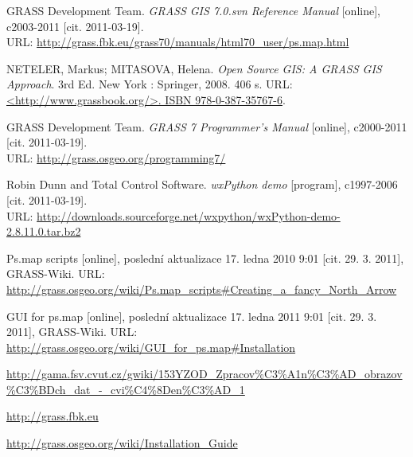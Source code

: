 \documentclass[a4paper,12pt,draft]{article}
\begin{document}
\begin{thebibliography}{9}
\label{literatura}
GRASS Development Team. \textit{GRASS GIS 7.0.svn Reference Manual} [online], c2003-2011 [cit. 2011-03-19].\\ URL: \url{http://grass.fbk.eu/grass70/manuals/html70_user/ps.map.html}

NETELER, Markus; MITASOVA, Helena. \textit{Open Source GIS: A GRASS GIS Approach}. 3rd Ed. New York : Springer, 2008. 406 s. URL: \url{<http://www.grassbook.org/>. ISBN 978-0-387-35767-6}.

GRASS Development Team. \textit{GRASS 7 Programmer's Manual} [online], c2000-2011 [cit. 2011-03-19].\\ URL: \url{http://grass.osgeo.org/programming7/}

Robin Dunn and Total Control Software. \textit{wxPython demo} [program], c1997-2006 [cit. 2011-03-19].\\ URL: \url{http://downloads.sourceforge.net/wxpython/wxPython-demo-2.8.11.0.tar.bz2}

Ps.map scripts [online], poslední aktualizace 17. ledna 2010 9:01 [cit. 29. 3. 2011], GRASS-Wiki. URL: \url{http://grass.osgeo.org/wiki/Ps.map_scripts#Creating_a_fancy_North_Arrow}

GUI for ps.map [online], poslední aktualizace 17. ledna 2011 9:01 [cit. 29. 3. 2011], GRASS-Wiki. URL: \url{http://grass.osgeo.org/wiki/GUI_for_ps.map#Installation}

 \url{http://gama.fsv.cvut.cz/gwiki/153YZOD_Zpracov%C3%A1n%C3%AD_obrazov%C3%BDch_dat_-_cvi%C4%8Den%C3%AD_1}

\url{http://grass.fbk.eu}

% 

\url{http://grass.osgeo.org/wiki/Installation_Guide}

\end{thebibliography}
\end{document}
